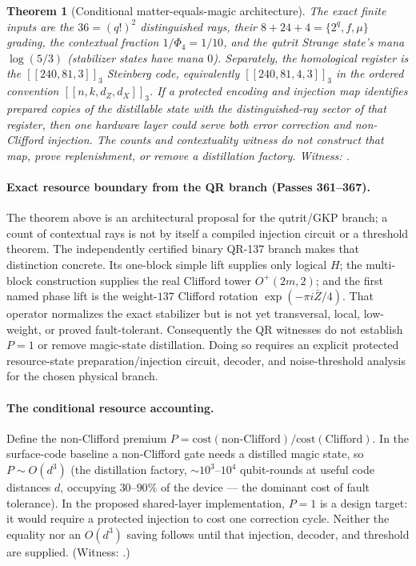\documentclass[11pt]{article}
\newtheorem{theorem}{Theorem}[section]
\begin{document}
\begin{theorem}[Conditional matter-equals-magic architecture]
The exact finite inputs are the $36=(q!)^2$ distinguished rays, their
$8+24+4=\{2^q,f,\mu\}$ grading, the contextual fraction
$1/\Phi_4=1/10$, and the qutrit Strange state's mana $\log(5/3)$
(stabilizer states have mana $0$).  Separately, the homological register is
the $[[240,81,3]]_3$ Steinberg code, equivalently
$[[240,81,4,3]]_3$ in the ordered convention $[[n,k,d_Z,d_X]]_3$.
If a protected encoding and injection map identifies prepared copies of the
distillable state with the distinguished-ray sector of that register, then
one hardware layer could serve both error correction and non-Clifford
injection.  The counts and contextuality witness do not construct that map,
prove replenishment, or remove a distillation factory.
\emph{Witness: .}
\end{theorem}

\paragraph{Exact resource boundary from the QR branch (Passes 361--367).}
The theorem above is an architectural proposal for the qutrit/GKP branch; a
count of contextual rays is not by itself a compiled injection circuit or a
threshold theorem.  The independently certified binary QR-137 branch makes
that distinction concrete.  Its one-block simple lift supplies only logical
$H$; the multi-block construction supplies the real Clifford tower
$O^+(2m,2)$; and the first named phase lift is the weight-$137$ Clifford
rotation $\exp(-\pi i\bar Z/4)$.  That operator normalizes the exact
stabilizer but is not yet transversal, local, low-weight, or proved
fault-tolerant.  Consequently the QR witnesses do not establish $P=1$ or
remove magic-state distillation.  Doing so requires an explicit protected
resource-state preparation/injection circuit, decoder, and noise-threshold
analysis for the chosen physical branch.

\paragraph{The conditional resource accounting.} Define
the non-Clifford premium $P=\mathrm{cost}(\text{non-Clifford})/\mathrm{cost}(\text{Clifford})$.
In the surface-code baseline a non-Clifford gate needs a distilled magic state, so
$P\sim O(d^3)$ (the distillation factory, $\sim10^3$--$10^4$ qubit-rounds at useful code
distances $d$, occupying $30$--$90\%$ of the device --- the dominant cost of fault
tolerance).  In the proposed shared-layer implementation, $P=1$ is a design
target: it would require a protected injection to cost one correction cycle.
Neither the equality nor an $O(d^3)$ saving follows until that injection,
decoder, and threshold are supplied. (Witness:
.)
\end{document}

